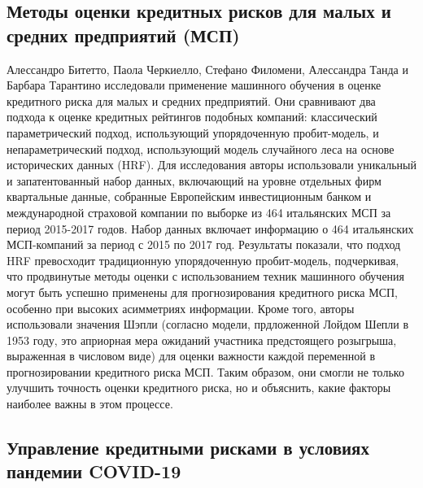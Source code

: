 \documentclass[14pt, letterpaper, twoside]{extarticle}
\begin{document}
\subsection{Методы оценки кредитных рисков для малых и средних предприятий (МСП)}

Алессандро Битетто, Паола Черкиелло, Стефано Филомени, Алессандра Танда и Барбара Тарантино \cite{bitetto2023machine} исследовали применение машинного обучения в оценке кредитного риска для малых и средних предприятий. Они сравнивают два подхода к оценке кредитных рейтингов подобных компаний: классический параметрический подход, использующий упорядоченную пробит-модель, и непараметрический подход, использующий модель случайного леса на основе исторических данных (HRF).
Для исследования авторы использовали уникальный и запатентованный набор данных, включающий на уровне отдельных фирм квартальные данные, собранные Европейским инвестиционным банком и международной страховой компании по выборке из 464 итальянских МСП за период 2015-2017 годов. Набор данных включает информацию о 464 итальянских МСП-компаний за период с 2015 по 2017 год.
Результаты показали, что подход HRF превосходит традиционную упорядоченную пробит-модель, подчеркивая, что продвинутые методы оценки с использованием техник машинного обучения могут быть успешно применены для прогнозирования кредитного риска МСП, особенно при высоких асимметриях информации.
Кроме того, авторы использовали значения Шэпли (согласно модели, прдложенной Лойдом Шепли в 1953 году, это априорная мера ожиданий участника предстоящего розыгрыша, выраженная в числовом виде) для оценки важности каждой переменной в прогнозировании кредитного риска МСП. Таким образом, они смогли не только улучшить точность оценки кредитного риска, но и объяснить, какие факторы наиболее важны в этом процессе.

\subsection{Управление кредитными рисками в условиях пандемии COVID-19}
\end{document}
